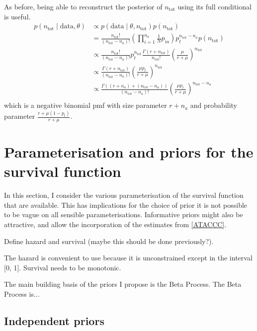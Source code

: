 \documentclass[thesis.tex]{subfiles}
\begin{document}
As before, being able to reconstruct the posterior of $n_\text{tot}$
using its full conditional is useful.
\begin{align}
p(n_\text{tot} \mid \text{data}, \theta)
&\propto p(\text{data} \mid \theta, n_\text{tot}) p(n_\text{tot}) \\
&= \frac{n_\text{tot}!}{(n_\text{tot}-n_a)!} \left( \prod_{i=1}^{n_a} \frac{1}{N} p_{ia} \right) p_t^{n_\text{tot}-n_a} p(n_\text{tot}) \\
&\propto \frac{n_\text{tot}!}{(n_\text{tot}-n_a)!} p_t^{n_\text{tot}} \frac{\Gamma(r + n_\text{tot})}{n_\text{tot}!} \left( \frac{\mu}{r + \mu} \right)^{n_\text{tot}}  \\
&\propto \frac{\Gamma(r + n_\text{tot})}{(n_\text{tot}-n_a)!} \left( \frac{\mu p_t}{r + \mu} \right)^{n_\text{tot}}  \\
&\propto \frac{\Gamma((r + n_a) + (n_\text{tot}- n_a))}{(n_\text{tot}-n_a)!} \left( \frac{\mu p_t}{r + \mu} \right)^{n_\text{tot}-n_a}  \\
\end{align}
which is a negative binomial pmf with size parameter $r + n_a$ and
probability parameter $\frac{r+\mu(1-p_t)}{r+\mu}$.

\section{Parameterisation and priors for the survival function} \label{perf-test:sec:parameters-priors}


In this section, I consider the various parameterisation of the survival function that are available.
This has implications for the choice of prior  it is not possible to be vague on all sensible parameterisations.
Informative priors might also be attractive, and allow the incorporation of the estimates from \autoref{ATACCC}.

Define hazard and survival (maybe this should be done previously?).

The hazard is convenient to use because it is unconstrained except in the interval [0, 1].
Survival needs to be monotonic.

The main building basis of the priors I propose is the Beta Process.
The Beta Process is...

\subsection{Independent priors}
\end{document}
